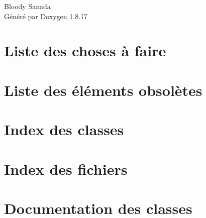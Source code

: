 \let\mypdfximage\pdfximage\def\pdfximage{\immediate\mypdfximage}\documentclass[twoside]{book}
\newcommand{\+}{\discretionary{\mbox{\scriptsize$\hookleftarrow$}}{}{}}
\newcommand{\clearemptydoublepage}{%
  \newpage{\pagestyle{empty}\cleardoublepage}%
}
\begin{document}
\hypersetup{pageanchor=false,
             bookmarksnumbered=true,
             pdfencoding=unicode
            }
\begin{titlepage}
\vspace*{7cm}
\begin{center}%
{\Large Bloody Sanada }\\
\vspace*{1cm}
{\large Généré par Doxygen 1.8.17}\\
\end{center}
\end{titlepage}
\clearemptydoublepage
{}
\tableofcontents
\clearemptydoublepage
{}
\hypersetup{pageanchor=true}

\chapter{Liste des choses à faire}
\label{todo}

\chapter{Liste des éléments obsolètes}
\label{deprecated}

\chapter{Index des classes}

\chapter{Index des fichiers}

\chapter{Documentation des classes}






















\end{document}
